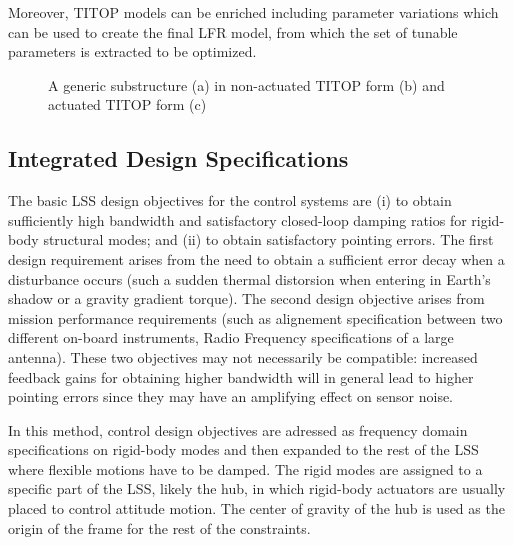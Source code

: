 \documentclass{ifacconf}
\begin{document}
Moreover, TITOP models can be enriched including parameter variations which can be used to create the final LFR model,  from which the set of tunable parameters  is extracted to be optimized.

\begin{figure}
\centering
{}
\hfill
\begin{minipage}{.48\linewidth}
\centering
{}
\end{minipage}\begin{minipage}{.48\linewidth}
\centering
{}
\end{minipage}
\caption{A generic substructure (a) in non-actuated TITOP form (b) and actuated TITOP form (c)}
\label{fig:main}
\end{figure}

\subsection{Integrated Design Specifications}
\label{subsec:IDspec}

The basic LSS design objectives for the control systems are (i) to obtain sufficiently high bandwidth and satisfactory closed-loop damping ratios for rigid-body structural modes; and (ii) to obtain satisfactory pointing errors. The first design requirement arises from the need to obtain a sufficient error decay when a disturbance occurs (such a sudden thermal distorsion when entering in Earth's shadow or a gravity gradient torque). The second design objective arises from mission performance requirements (such as alignement specification between two different on-board instruments, Radio Frequency specifications of a large antenna). These two objectives may not necessarily be compatible: increased feedback gains for obtaining higher bandwidth will in general lead to higher pointing errors since they may have an amplifying effect on sensor noise. 

In this method, control design objectives are adressed as frequency domain specifications on rigid-body modes and then expanded to the rest of the LSS where flexible motions have to be damped. The rigid modes are assigned to a specific part of the LSS, likely the hub, in which rigid-body actuators are usually placed to control attitude motion. The center of gravity of the hub is used as the origin of the frame for the rest of the constraints. 
\end{document}
